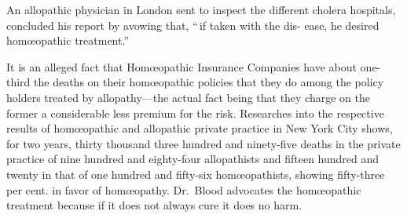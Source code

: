 \documentclass[10pt]{article}
\begin{document}
\begin{multicols}{3}
	An allopathic physician in London sent to inspect the different cholera\linebreak
	hospitals, concluded his report by avowing that, ``\,if taken with the dis-\linebreak
	ease, he desired hom{\oe}opathic treatment.''

	It is an alleged fact that Hom{\oe}opathic Insurance Companies have\linebreak
	about one-third the deaths on their hom{\oe}opathic policies that they do\linebreak
	among the policy holders treated by allopathy---the actual fact being that\linebreak
	they charge on the former a considerable less premium for the risk.\linebreak
	Researches into the respective results of hom{\oe}opathic and allopathic private\linebreak
	practice in New York City shows, for two years, thirty thousand three\linebreak
	hundred and ninety-five deaths in the private practice of nine hundred and\linebreak
	eighty-four allopathists and fifteen hundred and twenty in that of one\linebreak
	hundred and fifty-six hom{\oe}opathists, showing fifty-three per cent. in favor\linebreak
	of hom{\oe}opathy. Dr.~Blood advocates the hom{\oe}opathic treatment because\linebreak
	if it does not always cure it does no harm.


\end{multicols}
\end{document}

